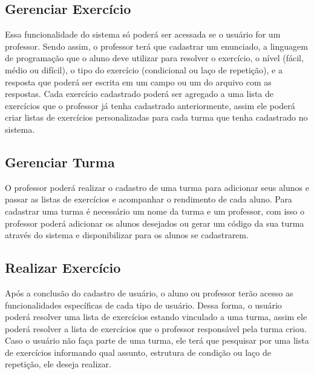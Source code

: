 \subsection{Gerenciar Exercício}

Essa funcionalidade do sistema só poderá ser acessada se o usuário for um professor. Sendo assim, o professor terá que cadastrar um enunciado, a linguagem de programação que o aluno deve utilizar para resolver o exercício, o nível (fácil, médio ou difícil), o tipo do exercício (condicional ou laço de repetição), e a resposta que poderá ser escrita em um campo ou um  do arquivo com as respostas. Cada exercício cadastrado poderá ser agregado a uma lista de exercícios que o professor já tenha cadastrado anteriormente, assim ele poderá criar listas de exercícios personalizadas para cada turma que tenha cadastrado no sistema.


\subsection{Gerenciar Turma}

O professor poderá realizar o cadastro de uma turma para adicionar seus alunos e passar as listas de exercícios e acompanhar o rendimento de cada aluno. Para cadastrar uma turma é necessário um nome da turma e um professor, com isso o professor poderá adicionar os alunos desejados ou gerar um código da sua turma através do sistema e disponibilizar para os alunos se cadastrarem.

\subsection{Realizar Exercício}

Após a conclusão do cadastro de usuário, o aluno ou professor terão acesso as funcionalidades específicas de cada tipo de usuário. Dessa forma, o usuário poderá resolver uma lista de exercícios estando vinculado a uma turma, assim ele poderá resolver a lista de exercícios que o professor responsável pela turma criou. Caso o usuário não faça parte de uma turma, ele terá que pesquisar por uma lista de exercícios informando qual assunto, estrutura de condição ou laço de repetição, ele deseja realizar.

